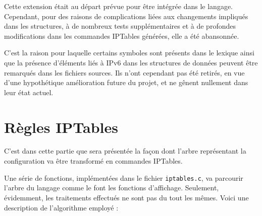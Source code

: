 \documentclass[a4paper,11pt]{report}
\begin{document}
Cette extension était au départ prévue pour être intégrée dans le langage.
Cependant, pour des raisons de complications liées aux changements impliqués
dans les structures, à de nombreux tests supplémentaires et à de profondes
modifications dans les commandes IPTables générées, elle a été abansonnée.

C'est la raison pour laquelle certains symboles sont présents dans le lexique
ainsi que la présence d'éléments liés à IPv6 dans les structures de données
peuvent être remarqués dans les fichiers sources. Ils n'ont cependant pas été
retirés, en vue d'une hypothétique amélioration future du projet, et ne gênent
nullement dans leur état actuel.

\chapter{Règles IPTables}

\begin{intro}
  C'est dans cette partie que sera présentée la façon dont l'arbre
  représentant la configuration va être transformé en commandes IPTables.
\end{intro}

Une série de fonctions, implémentées dans le fichier \verb!iptables.c!, va
parcourir l'arbre du langage comme le font les fonctions d'affichage.
Seulement, évidemment, les traitements effectués ne sont pas du tout les
mêmes. Voici une description de l'algorithme employé :
\end{document}
